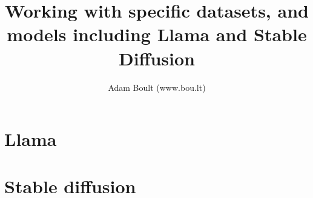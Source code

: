 \documentclass[oneside]{book}
\begin{document}
\author{Adam Boult (www.bou.lt)}
\title{Working with specific datasets, and models including Llama and Stable Diffusion}
\maketitle

\setcounter{tocdepth}{0}
\tableofcontents



\part{Llama}


\part{Stable diffusion}

\end{document}
